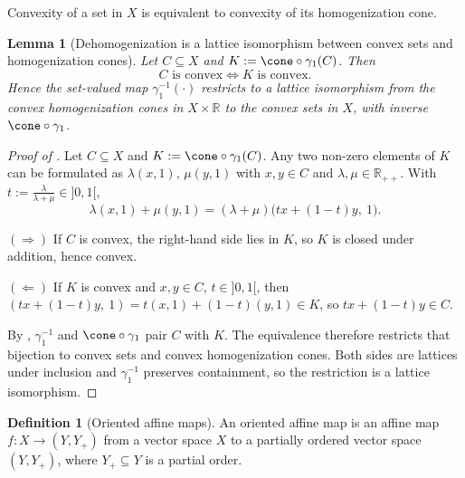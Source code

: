 \documentclass{article}
\theoremstyle{plain}
\newtheorem{lemma}[lemma]{Lemma}
\theoremstyle{definition}
\newtheorem{definition}[definition]{Definition}
\theoremstyle{remark}
\begin{document}
Convexity of a set in $X$ is equivalent to convexity of its homogenization cone.
\begin{lemma}[Dehomogenization is a lattice isomorphism between convex sets and homogenization cones]
\label{loc:dehomogenization_is_a_lattice_isomorphism_between_convex_sets_and_homogenization_cones.statement}
Let $C \subseteq X$ and $K := \cone\circ\gamma_1(C)$. Then
\begin{equation*}
C \text{ is convex} \iff K \text{ is convex}.
\end{equation*}
Hence the set-valued map $\gamma_1^{-1}(\cdot)$ restricts to a lattice isomorphism from the convex homogenization cones in $X  \times \mathbb{R}$ to the convex sets in $X$, with inverse $\cone \circ \gamma_1$.
\end{lemma}
\begin{proof}[\hypertarget{loc:dehomogenization_is_a_lattice_isomorphism_between_convex_sets_and_homogenization_cones.proof}{}Proof of ]

Let $C \subseteq X$ and $K := \cone\circ\gamma_1(C)$. Any two non-zero elements of $K$ can be formulated as $\lambda(x,1)$, $\mu(y,1)$ with $x,y \in C$ and $\lambda,\mu \in \mathbb{R}_{++}$. With $t := \frac{\lambda}{\lambda+\mu} \in ]0, 1[$,
\begin{equation*}
\lambda(x,1) + \mu(y,1) = (\lambda+\mu)\bigl(tx + (1-t)y,\ 1\bigr).
\end{equation*}

$(\Rightarrow)$ If $C$ is convex, the right-hand side lies in $K$, so $K$ is closed under addition, hence convex.

$(\Leftarrow)$ If $K$ is convex and $x,y \in C$, $t \in ]0,1[$, then $(tx+(1-t)y,\ 1) = t(x,1)+(1-t)(y,1) \in K$, so $tx+(1-t)y \in C$.

By , $\gamma_1^{-1}$ and $\cone\circ\gamma_1$ pair $C$ with $K$. The equivalence therefore restricts that bijection to convex sets and convex homogenization cones. Both sides are lattices under inclusion and $\gamma_1^{-1}$ preserves containment, so the restriction is a lattice isomorphism.
\end{proof}
\begin{definition}[Oriented affine maps]
\label{loc:oriented_affine_maps.statement}
An oriented affine map is an affine map $f:X \to (Y, Y_+)$ from a vector space $X$ to a partially ordered vector space $(Y, Y_+)$, where $Y_+ \subseteq Y$ is a partial order.
\end{definition}
\end{document}
